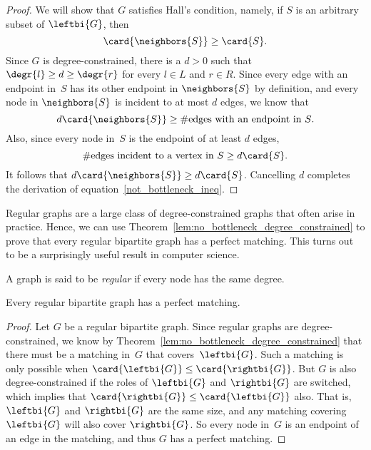 \begin{proof}

\iffalse
  The proof is by contradiction.  Suppose that $G$ is degree-constrained
  but that there is no matching that covers~$\leftbi{G}$.  By
  Theorem~\ref{thm:halls}, this means that there must be a bottleneck $S
  \subseteq \leftbi{G}$.
\fi

  We will show that $G$ satisfies Hall's condition, namely, if $S$ is
  an arbitrary subset of $\leftbi{G}$, then
\begin{equation}\label{not_bottleneck_ineq}
\card{\neighbors{S}} \ge \card{S}.  
\end{equation}
  Since $G$ is degree-constrained, there is a $d>0$ such that
  $\degr{l} \ge d \ge \degr{r}$ for every $l \in L$ and $r \in R$.
  Since every edge with an endpoint in~$S$ has its other endpoint in
  $\neighbors{S}$ by definition, and every node in $\neighbors{S}$ is incident to at
  most $d$ edges, we know that
\[
d\card{\neighbors{S}} \geq \#\text{edges with an endpoint in $S$}.
\]
Also, since every node in~$S$ is the endpoint of at least $d$ edges,
\[
\#\text{edges incident to a vertex in $S$} \geq d\card{S}.
\]
It follows that $d\card{\neighbors{S}} \ge d\card{S}$.  Cancelling $d$
completes the derivation of equation~\eqref{not_bottleneck_ineq}.
\end{proof}

Regular graphs are a large class of degree-constrained graphs that
often arise in practice.  Hence, we can use
Theorem~\ref{lem:no_bottleneck_degree_constrained} to prove that every
regular bipartite graph has a perfect matching.  This turns out to be
a surprisingly useful result in computer science.

\begin{definition}\label{def:5P}
A graph is said to be \emph{regular} if every node has the same degree.
\end{definition}

\begin{theorem}\label{thm:5M}
Every regular bipartite graph has a perfect matching.
\end{theorem}

\begin{proof}
  Let $G$ be a regular bipartite graph.  Since regular graphs are
  degree-constrained, we know by
  Theorem~\ref{lem:no_bottleneck_degree_constrained} that there must
  be a matching in~$G$ that covers~$\leftbi{G}$.  Such a matching is
  only possible when $\card{\leftbi{G}} \leq \card{\rightbi{G}}$.  But
  $G$ is also degree-constrained if the roles of $\leftbi{G}$ and
  $\rightbi{G}$ are switched, which implies that $\card{\rightbi{G}}
  \leq \card{\leftbi{G}}$ also.  That is, $\leftbi{G}$ and
  $\rightbi{G}$ are the same size, and any matching covering
  $\leftbi{G}$ will also cover $\rightbi{G}$.  So every node in~$G$ is
  an endpoint of an edge in the matching, and thus $G$ has a perfect
  matching.
\end{proof}

